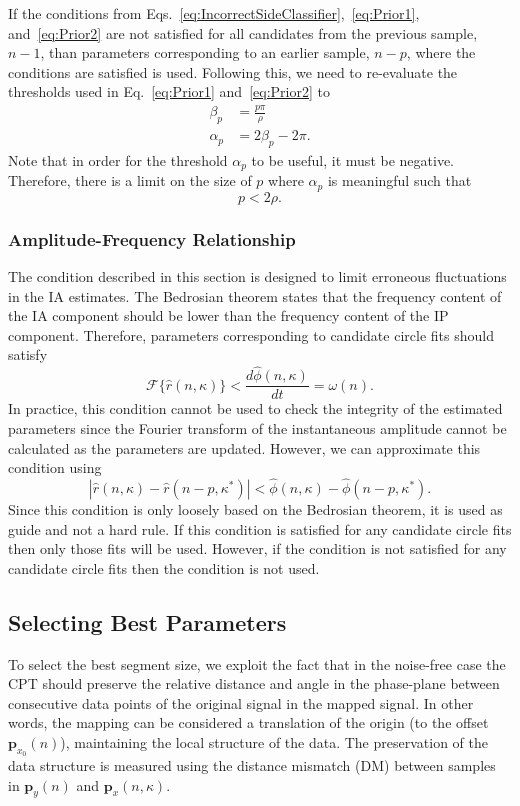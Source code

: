 \documentclass[journal,11pt,a4paper,onecolumn,draftcls]{IEEEtran}
\begin{document}
If the conditions from Eqs.~\ref{eq:IncorrectSideClassifier},~\ref{eq:Prior1}, and~\ref{eq:Prior2} are not satisfied for all candidates from the previous sample, $n-1$, than parameters corresponding to an earlier sample, $n-p$, where the conditions are satisfied is used. Following this, we need to re-evaluate the thresholds used in Eq.~\ref{eq:Prior1} and~\ref{eq:Prior2} to
\begin{align}
	\beta_p &= \frac{p\pi}{\rho} \\
	\alpha_p &=2\beta_p-2\pi.
\end{align}
Note that in order for the threshold $\alpha_p$ to be useful, it must be negative. Therefore, there is a limit on the size of $p$ where $\alpha_p$ is meaningful such that
\begin{equation}
	p < 2\rho.
\end{equation}

\subsubsection{Amplitude-Frequency Relationship}
The condition described in this section is designed to limit erroneous fluctuations in the IA estimates. The Bedrosian theorem states that the frequency content of the IA component should be lower than the frequency content of the IP component. Therefore, parameters corresponding to candidate circle fits should satisfy
\begin{equation}
	\mathcal{F}\{\hat{r}\left(n,\kappa\right)\} < \frac{d\hat{\phi}\left(n,\kappa \right)}{dt}=\omega(n).
\end{equation}
In practice, this condition cannot be used to check the integrity of the estimated parameters since the Fourier transform of the instantaneous amplitude cannot be calculated as the parameters are updated. However, we can approximate this condition using
\begin{equation}\label{eq:Prior3}
    \left| {\hat{r}\left(n,\kappa\right) - \hat{r}\left(n-p,\kappa^*\right)} \right| < \hat{\phi}\left(n,\kappa \right) - \hat{\phi}\left(n-p,\kappa^*\right).
\end{equation}
Since this condition is only loosely based on the Bedrosian theorem, it is used as guide and not a hard rule. If this condition is satisfied for any candidate circle fits then only those fits will be used. However, if the condition is not satisfied for any candidate circle fits then the condition is not used.

\subsection{Selecting Best Parameters}\label{sect:BestParameters}
To select the best segment size, we exploit the fact that in the noise-free case the CPT should preserve the relative distance and angle in the phase-plane between consecutive data points of the original signal in the mapped signal. In other words, the mapping can be considered a translation of the origin (to the offset $\mathbf{p}_{x_0}\left(n\right)$), maintaining the local structure of the data. The preservation of the data structure is measured using the distance mismatch (DM) between samples in $\mathbf{p}_y(n)$ and $\mathbf{p}_x(n,\kappa)$. 
\end{document}
